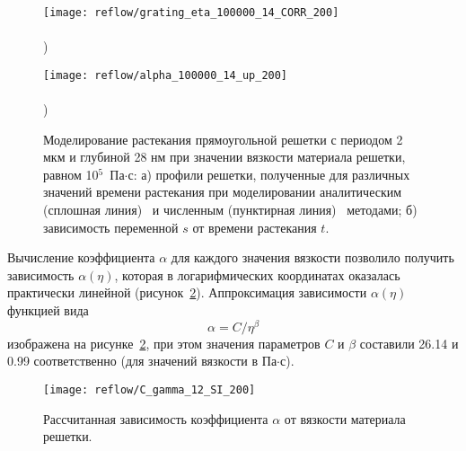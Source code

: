 \begin{figure}[h]
	\vspace{-1.5em}
	\begin{minipage}{0.5\textwidth}
		\texttt{[image: reflow/grating\_eta\_100000\_14\_CORR\_200]} \\
		\vspace{-28.5ex} \\ ) \\ \vspace{28.5ex}
	\end{minipage}
	\begin{minipage}{0.5\textwidth}
		\hspace{-1em} \texttt{[image: reflow/alpha\_100000\_14\_up\_200]} \\
		\vspace{-28.5ex} \\ ) \\ \vspace{28.5ex}
	\end{minipage}
	\vspace{-3.5em}
	\caption{Моделирование растекания прямоугольной решетки с периодом 2 мкм и глубиной 28 нм при значении вязкости материала решетки, равном 10$^\text{5}$~Па$\cdot$с: а) профили решетки, полученные для различных значений времени растекания при моделировании аналитическим (сплошная линия)~\cite{Leveder_2011} и численным (пунктирная линия)~\cite{Brakke_SE} методами; б) зависимость переменной $s$ от времени растекания $t$.}
	\label{fig:reflow_1}
\end{figure}

Вычисление коэффициента $\alpha$ для каждого значения вязкости позволило получить зависимость $\alpha(\eta)$, которая в логарифмических координатах оказалась практически линейной (рисунок~\ref{fig:eta_alpha}). Аппроксимация зависимости $\alpha(\eta)$ функцией вида
\begin{equation}
	\alpha = C / \eta^\beta
\end{equation}
изображена на рисунке~\ref{fig:eta_alpha}, при этом значения параметров $C$ и $\beta$ составили 26.14 и 0.99 соответственно (для значений вязкости в Па$\cdot$с).

\begin{figure}[h]
	\begin{center}
		\texttt{[image: reflow/С\_gamma\_12\_SI\_200]}
	\end{center}
	\vspace{-1.2em}
	\caption{Рассчитанная зависимость коэффициента $\alpha$ от вязкости материала решетки.}
	\label{fig:eta_alpha}
\end{figure}


